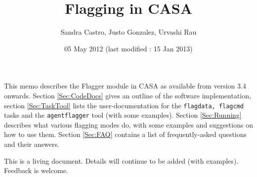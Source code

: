 \documentclass[11pt]{article}
\begin{document}
\title{Flagging in CASA}
\author{Sandra Castro, Justo Gonzalez, Urvashi Rau}
\date{05 May 2012 (last modified : 15 Jan 2013)}
\maketitle

This memo describes the Flagger module in CASA as available from version 3.4 onwards. Section \ref{Sec:CodeDocs} gives an outline of the software implementation, section \ref{Sec:TaskTool} lists the user-documentation for the {\tt flagdata, flagcmd} tasks and the {\tt agentflagger} tool (with some examples).  Section \ref{Sec:Running} describes what various flagging modes do, with some examples and suggestions on how to use them. Section \ref{Sec:FAQ} contains a list of frequently-asked questions and their answers.

This is a living document. Details will continue to be added (with examples). Feedback is welcome.

\tableofcontents




\end{document}
